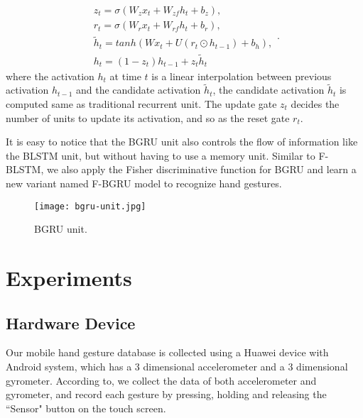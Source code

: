\documentclass[review]{elsarticle}
\begin{document}
\begin{equation}
\begin{array}{l}
{z_t} = \sigma \left( {{W_z}{x_t} + {W_{zf}}{h_t} + {b_z}} \right),\\
{r_t} = \sigma \left( {{W_r}{x_t} + {W_{rf}}{h_t} + {b_r}} \right),\\
{{\tilde h}_t} = tanh\left( {W{x_t} + U\left( {{r_t} \odot {h_{t - 1}}} \right) + {b_h}} \right),\\
{h_t} = \left( {1 - {z_t}} \right){h_{t - 1}} + {z_t}{{\tilde h}_t}
\end{array}.
\label{eq:bgru-unit}
\end{equation}
where the activation $h_t$ at time $t$ is a linear interpolation between previous activation $h_{t-1}$ and the candidate activation $\tilde{h}_t$, the candidate activation $\tilde{h}_t$ is computed same as traditional recurrent unit. The update gate $z_t$ decides the number of units to update its activation, and so as the reset gate $r_t$.

It is easy to notice that the BGRU unit also controls the flow of information like the BLSTM unit, but without having to use a memory unit. Similar to F-BLSTM, we also apply the Fisher discriminative function for BGRU and learn a new variant named F-BGRU model to recognize hand gestures.

\begin{figure*}[h]
	\centering
	\texttt{[image: bgru-unit.jpg]}
	\caption{BGRU unit.}
	\label{fig:bgru-unit}
\end{figure*}

\section{Experiments}\label{sec:experiments}
\subsection{Hardware Device}\label{sec:database}
Our mobile hand gesture database is collected using a Huawei device with Android system, which has a 3 dimensional accelerometer and a 3 dimensional gyrometer. According to\;\cite{lefebvre2013ANN}, we collect the data of both accelerometer and gyrometer, {and record each gesture by pressing, holding and releasing the ``Sensor" button on the touch screen.}
\end{document}
